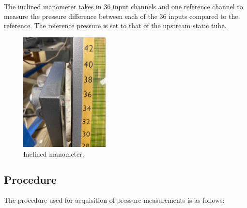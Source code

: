 \documentclass[runningheads]{llncs}
\begin{document}
The inclined manometer takes in 36 input channels and one reference channel to measure the pressure difference between each of the 36 inputs compared to the reference. The reference pressure is set to that of the upstream static tube.

\begin{figure}[h]
    \centering
    \includegraphics[width=0.4\textwidth]{Apparatus Pictures/inclined_manometer_slope_graduations.jpg}
    \caption{Inclined manometer.}
    \label{fig:manometer}
\end{figure}

\subsection{Procedure}


The procedure used for acquisition of pressure measurements is as follows:
\end{document}
